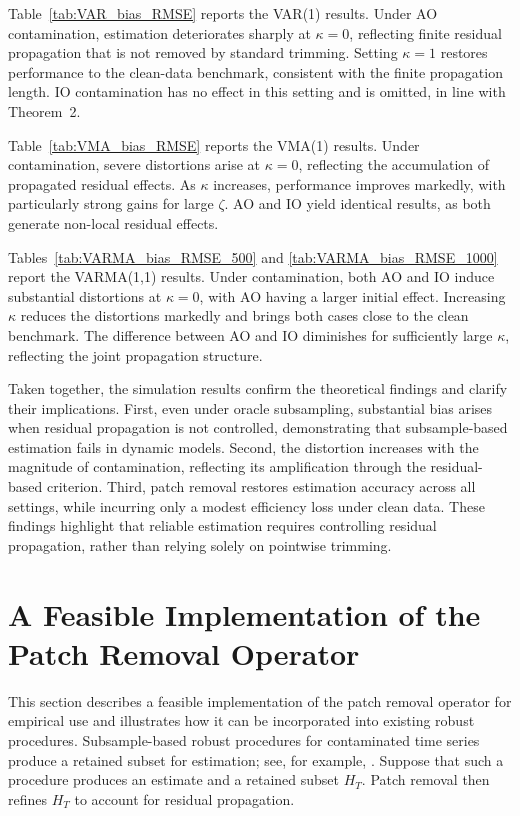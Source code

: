 \documentclass[12pt]{article}
\numberwithin{equation}{section}
\begin{document}
Table~\ref{tab:VAR_bias_RMSE} reports the VAR(1) results. 
Under AO contamination, estimation deteriorates sharply at $\kappa=0$, reflecting finite residual propagation that is not removed by standard trimming. 
Setting $\kappa=1$ restores performance to the clean-data benchmark, consistent with the finite propagation length. 
IO contamination has no effect in this setting and is omitted, in line with Theorem~2.

Table~\ref{tab:VMA_bias_RMSE} reports the VMA(1) results. 
Under contamination, severe distortions arise at $\kappa=0$, reflecting the accumulation of propagated residual effects. 
As $\kappa$ increases, performance improves markedly, with particularly strong gains for large $\zeta$. 
AO and IO yield identical results, as both generate non-local residual effects.

Tables~\ref{tab:VARMA_bias_RMSE_500} and \ref{tab:VARMA_bias_RMSE_1000} report the VARMA(1,1) results. 
Under contamination, both AO and IO induce substantial distortions at $\kappa=0$, with AO having a larger initial effect. 
Increasing $\kappa$ reduces the distortions markedly and brings both cases close to the clean benchmark. 
The difference between AO and IO diminishes for sufficiently large $\kappa$, reflecting the joint propagation structure.

Taken together, the simulation results confirm the theoretical findings and clarify their implications. 
First, even under oracle subsampling, substantial bias arises when residual propagation is not controlled, demonstrating that subsample-based estimation fails in dynamic models. 
Second, the distortion increases with the magnitude of contamination, reflecting its amplification through the residual-based criterion. 
Third, patch removal restores estimation accuracy across all settings, while incurring only a modest efficiency loss under clean data. 
These findings highlight that reliable estimation requires controlling residual propagation, rather than relying solely on pointwise trimming.


\section{A Feasible Implementation of the Patch Removal Operator} \label{sec:algorithm}

This section describes a feasible implementation of the patch removal operator for empirical use and illustrates how it can be incorporated into existing robust procedures.
Subsample-based robust procedures for contaminated time series produce a retained subset for estimation; see, for example, \citet{JohansenNielsen2016}.
Suppose that such a procedure produces an estimate and a retained subset $H_T$. 
Patch removal then refines $H_T$ to account for residual propagation.
\end{document}
